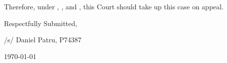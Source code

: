 \documentclass[12pt,\documentclassflag]{michiganCourtOfAppealsBrief}
\begin{document}
Therefore, under \cite{MCR 7.305(B)(3)}, \cite{MCR 7.305(B)(5a)}, and \cite{MCR 7.305(B)(5b)}, this Court should take up this case on appeal.



\vspace{1\baselineskip}

{ \setlength{\leftskip}{3.5in}
  Respectfully Submitted,

  /s/ Daniel Patru, P74387

\today

  \setlength{\leftskip}{0pt}}


\newpage\empty%



  

\end{document}
